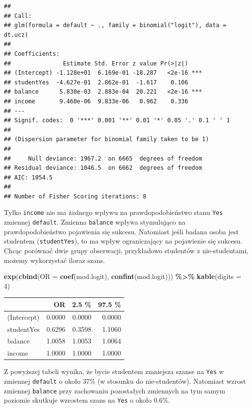 \documentclass[
]{book}
\newenvironment{Shaded}{\begin{snugshade}}{\end{snugshade}}
\newcommand{\AttributeTok}[1]{\textcolor[rgb]{0.13,0.29,0.53}{#1}}
\newcommand{\DecValTok}[1]{\textcolor[rgb]{0.00,0.00,0.81}{#1}}
\newcommand{\FunctionTok}[1]{\textcolor[rgb]{0.13,0.29,0.53}{\textbf{#1}}}
\newcommand{\NormalTok}[1]{#1}
\newcommand{\SpecialCharTok}[1]{\textcolor[rgb]{0.81,0.36,0.00}{\textbf{#1}}}
\theoremstyle{plain}
\theoremstyle{definition}
\theoremstyle{definition}
\theoremstyle{definition}
\theoremstyle{definition}
\theoremstyle{definition}
\theoremstyle{remark}
\begin{document}
\begin{verbatim}
## 
## Call:
## glm(formula = default ~ ., family = binomial("logit"), data = dt.ucz)
## 
## Coefficients:
##               Estimate Std. Error z value Pr(>|z|)    
## (Intercept) -1.128e+01  6.169e-01 -18.287   <2e-16 ***
## studentYes  -4.627e-01  2.862e-01  -1.617    0.106    
## balance      5.830e-03  2.883e-04  20.221   <2e-16 ***
## income       9.460e-06  9.833e-06   0.962    0.336    
## ---
## Signif. codes:  0 '***' 0.001 '**' 0.01 '*' 0.05 '.' 0.1 ' ' 1
## 
## (Dispersion parameter for binomial family taken to be 1)
## 
##     Null deviance: 1967.2  on 6665  degrees of freedom
## Residual deviance: 1046.5  on 6662  degrees of freedom
## AIC: 1054.5
## 
## Number of Fisher Scoring iterations: 8
\end{verbatim}

Tylko \texttt{income} nie ma żadnego wpływu na prawdopodobieństwo stanu \texttt{Yes} zmiennej \texttt{default}. Zmienna \texttt{balance} wpływa stymulująco na prawdopodobieństwo pojawienia się sukcesu. Natomiast jeśli badana osoba jest studentem (\texttt{studentYes}), to ma wpływ ograniczający na pojawienie się sukcesu. Chcąc porównać dwie grupy obserwacji, przykładowo studentów z nie-studentami, możemy wykorzystać iloraz szans.

\begin{Shaded}
\begin{Highlighting}[]
\FunctionTok{exp}\NormalTok{(}\FunctionTok{cbind}\NormalTok{(}\AttributeTok{OR =} \FunctionTok{coef}\NormalTok{(mod.logit), }\FunctionTok{confint}\NormalTok{(mod.logit))) }\SpecialCharTok{\%\textgreater{}\%} 
    \FunctionTok{kable}\NormalTok{(}\AttributeTok{digits =} \DecValTok{4}\NormalTok{)}
\end{Highlighting}
\end{Shaded}

\begin{tabular}{l|r|r|r}
\hline
  & OR & 2.5 \% & 97.5 \%\\
\hline
(Intercept) & 0.0000 & 0.0000 & 0.0000\\
\hline
studentYes & 0.6296 & 0.3598 & 1.1060\\
\hline
balance & 1.0058 & 1.0053 & 1.0064\\
\hline
income & 1.0000 & 1.0000 & 1.0000\\
\hline
\end{tabular}

Z powyższej tabeli wynika, że bycie studentem zmniejsza szanse na \texttt{Yes} w zmiennej \texttt{default} o około 37\% (w stosunku do nie-studentów). Natomiast wzrost zmiennej \texttt{balance} przy zachowaniu pozostałych zmiennych na tym samym poziomie skutkuje wzrostem szans na \texttt{Yes} o około 0.6\%.
\end{document}
